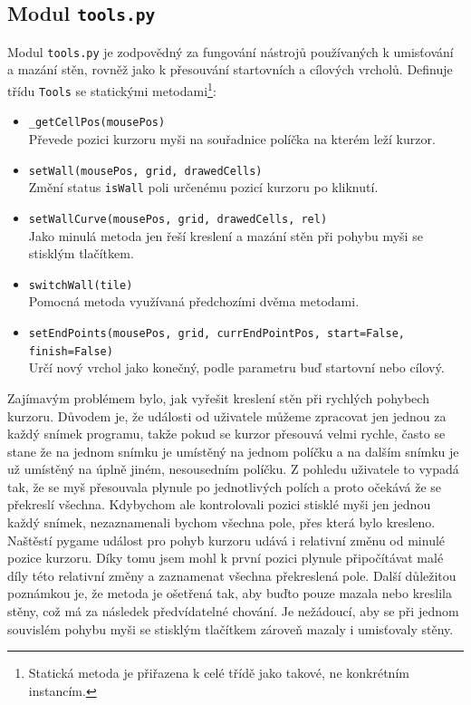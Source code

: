 \documentclass[12pt]{report}			%
\begin{document}
			
			
			\subsection{Modul \texttt{tools.py}}
			Modul \texttt{tools.py} je zodpovědný za fungování nástrojů používaných k umisťování a mazání stěn, rovněž jako k přesouvání startovních a cílových vrcholů. Definuje třídu \texttt{Tools} se statickými metodami\footnote{Statická metoda je přiřazena k celé třídě jako takové, ne konkrétním instancím.}:
			\begin{itemize}
			\setlength\itemsep{0.01mm}
			\item \texttt{\_getCellPos(mousePos)}\\
			Převede pozici kurzoru myši na souřadnice políčka na kterém leží kurzor.
			\item \texttt{setWall(mousePos, grid, drawedCells)}\\
			Změní status \texttt{isWall} poli určenému pozicí kurzoru po kliknutí.
			\item \texttt{setWallCurve(mousePos, grid, drawedCells, rel)}\\
			Jako minulá metoda jen řeší kreslení a mazání stěn při pohybu myši se stisklým tlačítkem.
			\item \texttt{switchWall(tile)}\\
			Pomocná metoda využívaná předchozími dvěma metodami.
			\item \texttt{setEndPoints(mousePos, grid, currEndPointPos, start=False, finish=False)}\\
			Určí nový vrchol jako konečný, podle parametru buď startovní nebo cílový.
			\end{itemize}						

			
			Zajímavým problémem bylo, jak vyřešit kreslení stěn při rychlých pohybech kurzoru. Důvodem je, že události od uživatele můžeme zpracovat jen jednou za každý snímek programu, takže pokud se kurzor přesouvá velmi rychle, často se stane že na jednom snímku je umístěný na jednom políčku a na dalším snímku je už umístěný na úplně jiném, nesousedním políčku. Z pohledu uživatele to vypadá tak, že se myš přesouvala plynule po jednotlivých polích a proto očekává že se překreslí všechna. Kdybychom ale kontrolovali pozici stisklé myši jen jednou každý snímek, nezaznamenali bychom všechna pole, přes která bylo kresleno. Naštěstí pygame událost pro pohyb kurzoru udává i relativní změnu od minulé pozice kurzoru. Díky tomu jsem mohl k první pozici plynule připočítávat malé díly této relativní změny a zaznamenat všechna překreslená pole. Další důležitou poznámkou je, že metoda je ošetřená tak, aby buďto pouze mazala nebo kreslila stěny, což má za následek předvídatelné chování. Je nežádoucí, aby se při jednom souvislém pohybu myši se stisklým tlačítkem zároveň mazaly i umisťovaly stěny.
			
\end{document}
